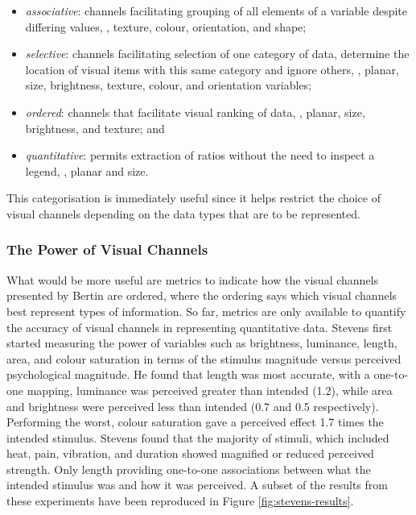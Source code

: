 \begin{itemize}
\item \emph{associative}: channels facilitating grouping of all elements of a variable despite differing values, \eg, texture, colour, orientation, and shape;
\item \emph{selective}: channels facilitating selection of one category of data, determine the location of visual items with this same category and ignore others, \eg, planar, size, brightness, texture, colour, and orientation variables;
\item \emph{ordered}: channels that facilitate visual ranking of data, \eg, planar, size, brightness, and texture; and
\item \emph{quantitative}: permits extraction of ratios without the need to inspect a legend, \eg, planar and size.
\end{itemize} 

This categorisation is immediately useful since it helps restrict the choice of visual channels depending on the data types that are to be represented. 

\subsubsection{The Power of Visual Channels}
\label{sec:vispower}
What would be more useful are metrics to indicate how the visual channels presented by Bertin are ordered, where the ordering says which visual channels best represent types of information.
So far, metrics are only available to quantify the accuracy of visual channels in representing quantitative data. Stevens \cite{stevens1975} first started measuring the power of variables such as brightness, luminance, length, area, and colour saturation in terms of the stimulus magnitude versus perceived psychological magnitude. 
He found that length was most accurate, with a one-to-one mapping, luminance was perceived greater than intended (1.2), while area and brightness were perceived less than intended (0.7 and 0.5 respectively). 
Performing the worst, colour saturation gave a perceived effect 1.7 times the intended stimulus. 
Stevens found that the majority of stimuli, which included heat, pain, vibration, and duration showed magnified or reduced perceived strength. 
Only length providing one-to-one associations between what the intended stimulus was and how it was perceived. 
A subset of the results from these experiments have been reproduced in Figure \ref{fig:stevens-results}.

